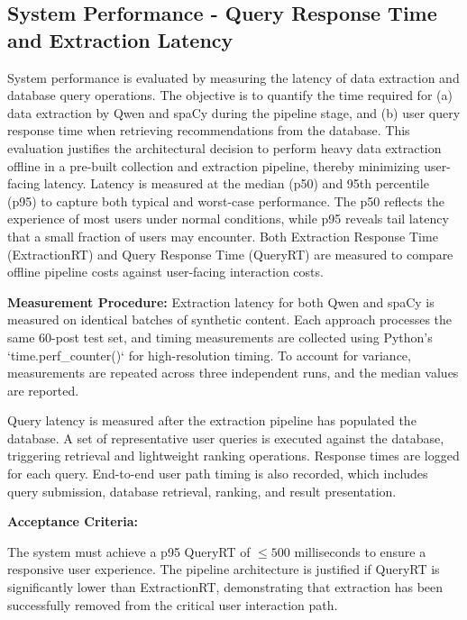 \documentclass[a4paper,12pt]{report}
\begin{document}
\subsection{System Performance - Query Response Time and Extraction Latency}
System performance is evaluated by measuring the latency of data extraction and database query operations. The objective is to quantify the time required for (a) data extraction by Qwen and spaCy during the pipeline stage, and (b) user query response time when retrieving recommendations from the database. This evaluation justifies the architectural decision to perform heavy data extraction offline in a pre-built collection and extraction pipeline, thereby minimizing user-facing latency.
Latency is measured at the median (p50) and 95th percentile (p95) to capture both typical and worst-case performance. The p50 reflects the experience of most users under normal conditions, while p95 reveals tail latency that a small fraction of users may encounter. Both Extraction Response Time (ExtractionRT) and Query Response Time (QueryRT) are measured to compare offline pipeline costs against user-facing interaction costs.

\textbf{Measurement Procedure:} Extraction latency for both Qwen and spaCy is measured on identical batches of synthetic content. Each approach processes the same 60-post test set, and timing measurements are collected using Python's `time.perf\_counter()` for high-resolution timing. To account for variance, measurements are repeated across three independent runs, and the median values are reported.

Query latency is measured after the extraction pipeline has populated the database. A set of representative user queries is executed against the database, triggering retrieval and lightweight ranking operations. Response times are logged for each query. End-to-end user path timing is also recorded, which includes query submission, database retrieval, ranking, and result presentation.

\textbf{Acceptance Criteria:}

The system must achieve a p95 QueryRT of $\le 500$ milliseconds to ensure a responsive user experience. The pipeline architecture is justified if QueryRT is significantly lower than ExtractionRT, demonstrating that extraction has been successfully removed from the critical user interaction path.
\end{document}
